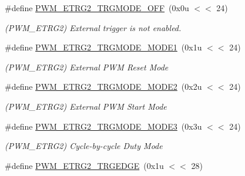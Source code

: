 \begin{DoxyCompactItemize}
\item 
\mbox{\label{group__SAMV71__PWM_ga6d89a826b5465b0522869c23cecaf7b0}} 
\#define \mbox{\hyperlink{group__SAMV71__PWM_ga6d89a826b5465b0522869c23cecaf7b0}{P\+W\+M\+\_\+\+E\+T\+R\+G2\+\_\+\+T\+R\+G\+M\+O\+D\+E\+\_\+\+O\+FF}}~(0x0u $<$$<$ 24)
\begin{DoxyCompactList}\small\item\em (P\+W\+M\+\_\+\+E\+T\+R\+G2) External trigger is not enabled. \end{DoxyCompactList}\item 
\mbox{\label{group__SAMV71__PWM_gac5b9d07ea4fb954ac651e771ea2950b3}} 
\#define \mbox{\hyperlink{group__SAMV71__PWM_gac5b9d07ea4fb954ac651e771ea2950b3}{P\+W\+M\+\_\+\+E\+T\+R\+G2\+\_\+\+T\+R\+G\+M\+O\+D\+E\+\_\+\+M\+O\+D\+E1}}~(0x1u $<$$<$ 24)
\begin{DoxyCompactList}\small\item\em (P\+W\+M\+\_\+\+E\+T\+R\+G2) External P\+WM Reset Mode \end{DoxyCompactList}\item 
\mbox{\label{group__SAMV71__PWM_ga62131ad36ab4ee457cfb8b7802748cf4}} 
\#define \mbox{\hyperlink{group__SAMV71__PWM_ga62131ad36ab4ee457cfb8b7802748cf4}{P\+W\+M\+\_\+\+E\+T\+R\+G2\+\_\+\+T\+R\+G\+M\+O\+D\+E\+\_\+\+M\+O\+D\+E2}}~(0x2u $<$$<$ 24)
\begin{DoxyCompactList}\small\item\em (P\+W\+M\+\_\+\+E\+T\+R\+G2) External P\+WM Start Mode \end{DoxyCompactList}\item 
\mbox{\label{group__SAMV71__PWM_ga1301375474c413ec7b447e16a169f3ba}} 
\#define \mbox{\hyperlink{group__SAMV71__PWM_ga1301375474c413ec7b447e16a169f3ba}{P\+W\+M\+\_\+\+E\+T\+R\+G2\+\_\+\+T\+R\+G\+M\+O\+D\+E\+\_\+\+M\+O\+D\+E3}}~(0x3u $<$$<$ 24)
\begin{DoxyCompactList}\small\item\em (P\+W\+M\+\_\+\+E\+T\+R\+G2) Cycle-\/by-\/cycle Duty Mode \end{DoxyCompactList}\item 
\mbox{\label{group__SAMV71__PWM_gad870723726d1dcc162f83d624855b12b}} 
\#define \mbox{\hyperlink{group__SAMV71__PWM_gad870723726d1dcc162f83d624855b12b}{P\+W\+M\+\_\+\+E\+T\+R\+G2\+\_\+\+T\+R\+G\+E\+D\+GE}}~(0x1u $<$$<$ 28)
$$
\end{DoxyCompactItemize}
